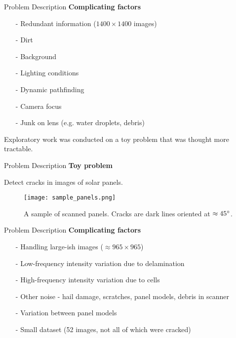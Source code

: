 \documentclass[10pt]{beamer}
\begin{document}
\begin{frame}[fragile]{Problem Description}
	\textbf{Complicating factors}
	\begin{itemize}
		\item[-] Redundant information ($1400 \times 1400$ images)
		\item[-] Dirt
		\item[-] Background
		\item[-] Lighting conditions
		\item[-] Dynamic pathfinding
		\item[-] Camera focus
		\item[-] Junk on lens (e.g. water droplets, debris)
	\end{itemize}
	
	Exploratory work was conducted on a toy problem that was thought more tractable.
\end{frame}


\begin{frame}[fragile]{Problem Description}
	\textbf{Toy problem}
	
	 Detect cracks in images of solar panels.
	 
	\begin{figure}
		\texttt{[image: sample\_panels.png]}
		\caption{A sample of scanned panels. Cracks are dark lines oriented at $\approx 45\degree$.}
	\end{figure}
\end{frame}

\begin{frame}[fragile]{Problem Description}
	\textbf{Complicating factors}
	\begin{itemize}
		\item[-] Handling large-ish images ($\approx 965 \times 965$)
		\item[-] Low-frequency intensity variation due to delamination
		\item[-] High-frequency intensity variation due to cells
		\item[-] Other noise - hail damage, scratches, panel models, debris in scanner
		\item[-] Variation between panel models
		\item[-] Small dataset (52 images, not all of which were cracked)
	\end{itemize}
\end{frame}
\end{document}
